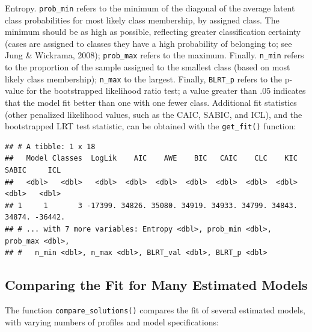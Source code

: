 \documentclass[man]{apa6}
\newenvironment{Shaded}{\begin{snugshade}}{\end{snugshade}}
\newcommand{\DecValTok}[1]{\textcolor[rgb]{0.00,0.00,0.81}{#1}}
\newcommand{\KeywordTok}[1]{\textcolor[rgb]{0.13,0.29,0.53}{\textbf{#1}}}
\newcommand{\NormalTok}[1]{#1}
\newcommand{\OperatorTok}[1]{\textcolor[rgb]{0.81,0.36,0.00}{\textbf{#1}}}
\newcommand{\StringTok}[1]{\textcolor[rgb]{0.31,0.60,0.02}{#1}}
\begin{document}
Entropy. \texttt{prob\_min} refers to the minimum of the diagonal of the average latent
class probabilities for most likely class membership, by assigned class. The
minimum should be as high as possible, reflecting greater classification
certainty (cases are assigned to classes they have a high probability of
belonging to; see Jung \& Wickrama, 2008); \texttt{prob\_max} refers to the maximum.
Finally. \texttt{n\_min} refers to the proportion of the sample assigned to the smallest
class (based on most likely class membership); \texttt{n\_max} to the largest. Finally,
\texttt{BLRT\_p} refers to the p-value for the bootstrapped likelihood ratio test; a
value greater than .05 indicates that the model fit better than one with one
fewer class. Additional fit statistics (other penalized likelihood values, such
as the CAIC, SABIC, and ICL), and the bootstrapped LRT test statistic, can be
obtained with the \texttt{get\_fit()} function:

\begin{Shaded}
\end{Shaded}

\begin{verbatim}
## # A tibble: 1 x 18
##   Model Classes  LogLik    AIC    AWE    BIC   CAIC    CLC    KIC  SABIC     ICL
##   <dbl>   <dbl>   <dbl>  <dbl>  <dbl>  <dbl>  <dbl>  <dbl>  <dbl>  <dbl>   <dbl>
## 1     1       3 -17399. 34826. 35080. 34919. 34933. 34799. 34843. 34874. -36442.
## # ... with 7 more variables: Entropy <dbl>, prob_min <dbl>, prob_max <dbl>,
## #   n_min <dbl>, n_max <dbl>, BLRT_val <dbl>, BLRT_p <dbl>
\end{verbatim}

\hypertarget{comparing-the-fit-for-many-estimated-models}{%
\subsection{Comparing the Fit for Many Estimated Models}\label{comparing-the-fit-for-many-estimated-models}}

The function \texttt{compare\_solutions()} compares the fit of several estimated models,
with varying numbers of profiles and model specifications:
\end{document}

